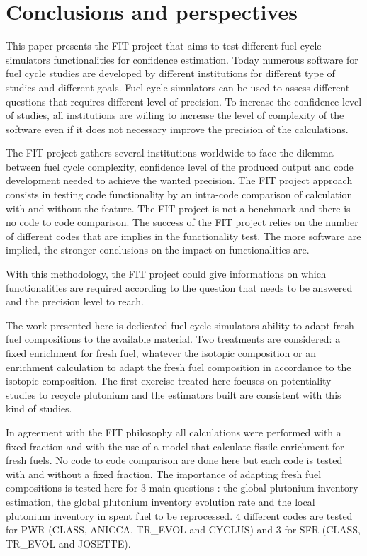 \section{Conclusions and perspectives}

This paper presents the FIT project that aims to test different fuel cycle
simulators functionalities for confidence estimation. Today numerous software
for fuel cycle studies are developed by different institutions for different
type of studies and different goals. Fuel cycle simulators can be used to assess
different questions that requires different level of precision. To increase the
confidence level of studies, all institutions are willing to increase the level
of complexity of the software even if it does not necessary improve the
precision of the calculations. 

The FIT project gathers several institutions worldwide to face the dilemma
between fuel cycle complexity, confidence level of the produced output and code
development needed to achieve the wanted precision. The FIT project approach
consists in testing code functionality by an intra-code comparison of
calculation with and without the feature. The FIT project is not a benchmark and
there is no code to code comparison. The success of the FIT project relies on
the number of different codes that are implies in the functionality test. The
more software are implied, the stronger conclusions on the impact on
functionalities are.   

With this methodology, the FIT project could give informations on which
functionalities are required according to the question that needs to be answered
and the precision level to reach.

The work presented here is dedicated fuel cycle simulators ability to adapt
fresh fuel compositions to the available material. Two treatments are
considered: a fixed enrichment for fresh fuel, whatever the isotopic composition
or an enrichment calculation to adapt the fresh fuel composition in accordance
to the isotopic composition. The first exercise treated here focuses on
potentiality studies to recycle plutonium and the estimators built are
consistent with this kind of studies.  

In agreement with the FIT philosophy all calculations were performed with a
fixed fraction and with the use of a model that calculate fissile enrichment for
fresh fuels. No code to code comparison are done here but each code is tested
with and without a fixed fraction. The importance of adapting fresh fuel
compositions is tested here for 3 main questions : the global plutonium
inventory estimation, the global plutonium inventory evolution rate and the
local plutonium inventory in spent fuel to be reprocessed. 4 different codes are
tested for PWR (CLASS, ANICCA, TR\_EVOL and CYCLUS) and 3 for SFR (CLASS,
TR\_EVOL and JOSETTE). 

